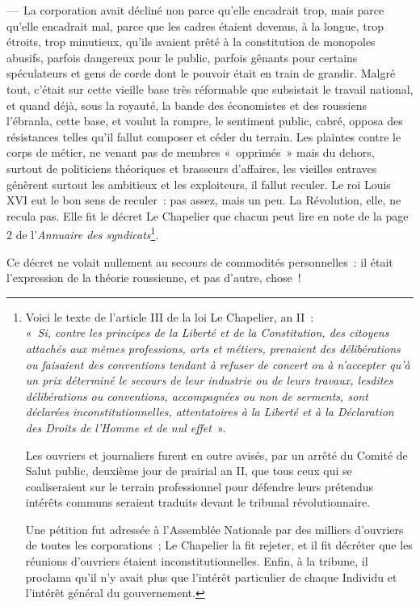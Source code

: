 \documentclass[french,twoside]{book} %
\begin{document}
— La corporation avait décliné non parce qu’elle encadrait trop, mais parce qu’elle encadrait mal, parce que les cadres étaient devenus, à la longue, trop étroits, trop minutieux, qu’ils avaient prêté à la constitution de monopoles abusifs, parfois dangereux pour le public, parfois gênants pour certains spéculateurs et gens de corde dont le pouvoir était en train de grandir. Malgré tout, c’était sur cette vieille base très réformable que subsistait le travail national, et quand déjà, sous la royauté, la bande des économistes et des roussiens l’ébranla, cette base, et voulut la rompre, le sentiment public, cabré, opposa des résistances telles qu’il fallut composer et céder du terrain. Les plaintes contre le corps de métier, ne venant pas de membres « opprimés » mais du dehors, surtout de politiciens théoriques et brasseurs d’affaires, les vieilles entraves génèrent surtout les ambitieux et les exploiteurs, il fallut reculer. Le roi Louis XVI eut le bon sens de reculer : pas assez, mais un peu. La Révolution, elle, ne recula pas. Elle fit le décret Le Chapelier que chacun peut lire en note de la page 2 de l’\emph{Annuaire des syndicats}\footnote{ \noindent Voici le texte de l’article III de la loi Le Chapelier, an II : \\
« \emph{Si, contre les principes de la Liberté et de la Constitution, des citoyens attachés aux mêmes professions, arts et métiers, prenaient des délibérations ou faisaient des conventions tendant à refuser de concert ou à n’accepter qu’à un prix déterminé le secours de leur industrie ou de leurs travaux, lesdites délibérations ou conventions, accompagnées ou non de serments, sont déclarées inconstitutionnelles, attentatoires à la Liberté et à la Déclaration des Droits de l’Homme et de nul effet} ».\par
 Les ouvriers et journaliers furent en outre avisés, par un arrêté du Comité de Salut public, deuxième jour de prairial an II, que tous ceux qui se coaliseraient sur le terrain professionnel pour défendre leurs prétendus intérêts communs seraient traduits devant le tribunal révolutionnaire.\par
 Une pétition fut adressée à l’Assemblée Nationale par des milliers d’ouvriers de toutes les corporations ; Le Chapelier la fit rejeter, et il fit décréter que les réunions d’ouvriers étaient inconstitutionnelles. Enfin, à la tribune, il proclama qu’il n’y avait plus que l’intérêt particulier de chaque Individu et l’intérêt général du gouvernement.
}.\par
Ce décret ne volait nullement au secours de commodités personnelles : il était l’expression de la théorie roussienne, et pas d’autre, chose !\par
\end{document}
